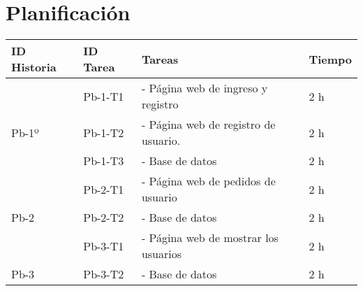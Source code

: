 \chapter{Planificación}

\begin{table}[htbp]
	\begin{center}
		\begin{tabular}{| p{2.0cm}|p{2.0cm} | p{5.5 cm} | p{3.0cm}| }
			\hline
			\centering\textbf{ID Historia} & \textbf{ID Tarea}& \textbf{Tareas} & \textbf{Tiempo}
			
			\\\hline
			
			 & \centering Pb-1-T1 & - Página web de ingreso y registro & 2 h
			\\
			\centering Pb-1º & \centering Pb-1-T2 & - Página web de registro de usuario. & 2 h
			\\
			& \centering Pb-1-T3 & - Base de datos & 2 h
			
			\\\hline
			 & \centering Pb-2-T1 & - Página web de pedidos de usuario & 2 h
			\\
			\centering Pb-2
			& \centering Pb-2-T2 & - Base de datos & 2 h
			
			\\\hline
			& \centering Pb-3-T1 & - Página web de mostrar los usuarios & 2 h
			\\
			\centering Pb-3
			& \centering Pb-3-T2 & - Base de datos & 2 h
			
			\\\hline
		\end{tabular}
	\end{center}
\end{table}